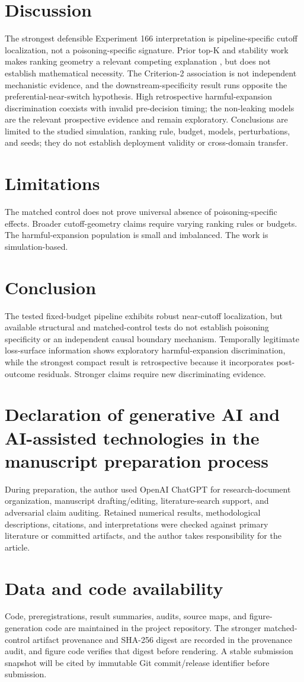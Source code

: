 \documentclass[preprint,12pt]{elsarticle}
\begin{document}
\section{Discussion} The strongest defensible Experiment 166 interpretation is pipeline-specific cutoff localization, not a poisoning-specific signature. Prior top-K and stability work makes ranking geometry a relevant competing explanation \cite{chen2015spectral,asudeh2018stable}, but does not establish mathematical necessity. The Criterion-2 association is not independent mechanistic evidence, and the downstream-specificity result runs opposite the preferential-near-switch hypothesis. High retrospective harmful-expansion discrimination coexists with invalid pre-decision timing; the non-leaking models are the relevant prospective evidence and remain exploratory. Conclusions are limited to the studied simulation, ranking rule, budget, models, perturbations, and seeds; they do not establish deployment validity or cross-domain transfer.
\section{Limitations} The matched control does not prove universal absence of poisoning-specific effects. Broader cutoff-geometry claims require varying ranking rules or budgets. The harmful-expansion population is small and imbalanced. The work is simulation-based.
\section{Conclusion} The tested fixed-budget pipeline exhibits robust near-cutoff localization, but available structural and matched-control tests do not establish poisoning specificity or an independent causal boundary mechanism. Temporally legitimate loss-surface information shows exploratory harmful-expansion discrimination, while the strongest compact result is retrospective because it incorporates post-outcome residuals. Stronger claims require new discriminating evidence.
\section*{Declaration of generative AI and AI-assisted technologies in the manuscript preparation process} During preparation, the author used OpenAI ChatGPT for research-document organization, manuscript drafting/editing, literature-search support, and adversarial claim auditing. Retained numerical results, methodological descriptions, citations, and interpretations were checked against primary literature or committed artifacts, and the author takes responsibility for the article.
\section*{Data and code availability} Code, preregistrations, result summaries, audits, source maps, and figure-generation code are maintained in the project repository. The stronger matched-control artifact provenance and SHA-256 digest are recorded in the provenance audit, and figure code verifies that digest before rendering. A stable submission snapshot will be cited by immutable Git commit/release identifier before submission.

\end{document}
